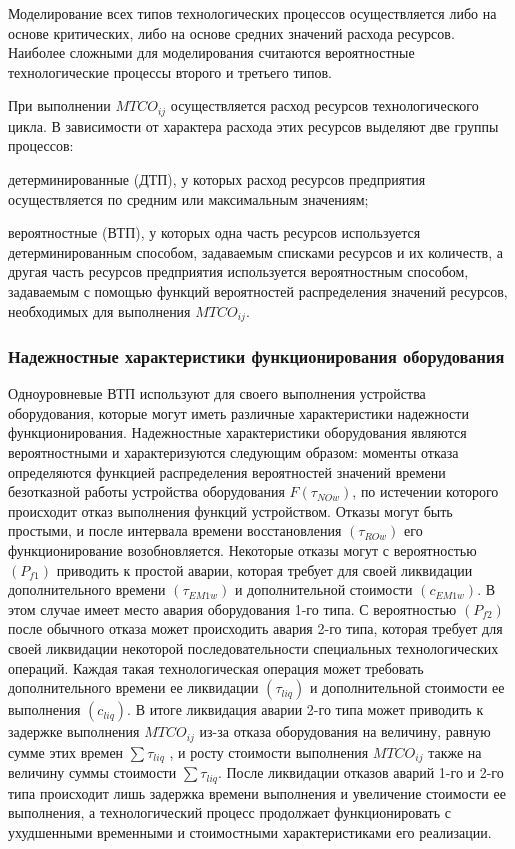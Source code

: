 Моделирование всех типов технологических процессов осуществляется либо на основе критических, либо на основе средних значений расхода ресурсов. Наиболее сложными для моделирования считаются вероятностные технологические процессы второго и третьего типов.

При выполнении $MTCO_{ij}$ осуществляется расход ресурсов технологического цикла. В зависимости от характера расхода этих ресурсов выделяют две группы процессов:

\begin{textitemize}
    \item детерминированные (ДТП), у которых расход ресурсов предприятия осуществляется по средним или максимальным значениям;
    \item вероятностные (ВТП), у которых одна часть ресурсов используется детерминированным способом, задаваемым списками ресурсов и их количеств, а другая часть ресурсов предприятия используется вероятностным способом, задаваемым с помощью функций вероятностей распределения значений ресурсов, необходимых для выполнения  $MTCO_{ij}$.
\end{textitemize}


\subsubsection{Надежностные характеристики функционирования оборудования}

Одноуровневые ВТП используют для своего выполнения устройства оборудования, которые могут иметь различные характеристики надежности функционирования.
Надежностные характеристики оборудования являются вероятностными и характеризуются следующим образом: моменты отказа определяются функцией распределения вероятностей значений времени безотказной работы устройства оборудования $F( \tau _{NOw})$, по истечении которого происходит отказ выполнения функций устройством. Отказы могут быть простыми, и после интервала времени восстановления $(\tau _{ROw})$ его функционирование возобновляется. Некоторые отказы могут с вероятностью $( P_{f1})$ приводить к простой аварии, которая требует для своей ликвидации дополнительного времени $( \tau _{EM1w})$ и дополнительной стоимости $( c _{EM1w})$. В этом случае имеет место авария оборудования 1-го типа. С вероятностью $( P_{f2})$ после обычного отказа может происходить авария 2-го типа, которая требует для своей ликвидации некоторой последовательности специальных технологических операций. Каждая такая технологическая операция может требовать дополнительного времени ее ликвидации $( \tau _{liq})$ и дополнительной стоимости ее выполнения $( c_{liq})$. В итоге ликвидация аварии 2-го типа может приводить к задержке выполнения $MTCO_{ij}$ из-за отказа оборудования на величину, равную сумме этих времен $\sum\tau_{liq}$ , и росту стоимости выполнения $MTCO_{ij}$ также на величину суммы стоимости $\sum\tau_{liq}$. После ликвидации отказов аварий 1-го и 2-го типа происходит лишь задержка времени выполнения и увеличение стоимости ее выполнения, а технологический процесс продолжает функционировать с ухудшенными временными и стоимостными характеристиками его реализации.

